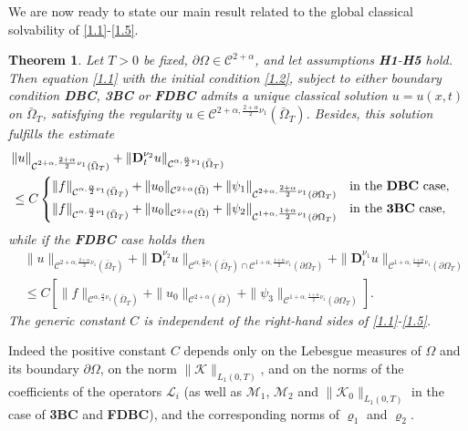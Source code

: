 \documentclass[reqno]{amsart}
\def\C {\mathcal{C}}
\newtheorem{theorem}[proposition]{Theorem}
\theoremstyle{definition}
\numberwithin{equation}{section}
\begin{document}
\noindent
We are now ready to state our main result related to the global classical solvability of \eqref{1.1}-\eqref{1.5}.
\begin{theorem}\label{t3.1}
Let $T>0$ be fixed, $\partial\Omega\in\C^{2+\alpha}$,
and let assumptions {\rm \textbf{H1}-\textbf{H5}} hold.
Then equation \eqref{1.1} with the initial condition \eqref{1.2}, subject to
either boundary condition
{\rm \textbf{DBC}}, {\rm \textbf{3BC}}  or
{\rm \textbf{FDBC}} admits a unique classical solution $u=u(x,t)$ on $\bar{\Omega}_{T}$, satisfying the regularity $u\in \C^{2+\alpha,\frac{2+\alpha}{2}\nu_{1}}(\bar{\Omega}_{T})$.
Besides, this solution fulfills the estimate
\begin{align*}
&\|u\|_{\C^{2+\alpha,\frac{2+\alpha}{2}\nu_{1}}(\bar{\Omega}_{T})}+\|\mathbf{D}_{t}^{\nu_2}u\|_{\C^{\alpha,\frac{\alpha}{2}\nu_{1}}(\bar{\Omega}_{T})}\\
&
\leq C
\begin{cases}
\|f\|_{\C^{\alpha,\frac{\alpha}{2}\nu_{1}}(\bar{\Omega}_{T})}+\|u_0\|_{\C^{2+\alpha}(\bar{\Omega})}+\|\psi_{1}\|_{\C^{2+\alpha,\frac{2+\alpha}{2}\nu_{1}}(\partial\Omega_{T})}\quad\text{in the
{\rm \textbf{DBC}} case},\\
\|f\|_{\C^{\alpha,\frac{\alpha}{2}\nu_{1}}(\bar{\Omega}_{T})}+\|u_0\|_{\C^{2+\alpha}(\bar{\Omega})}+\|\psi_{2}\|_{\C^{1+\alpha,\frac{1+\alpha}{2}\nu_{1}}(\partial\Omega_{T})}\quad
\text{in the {\rm\textbf{3BC}} case},
\end{cases}
\end{align*}
while if the {\rm\textbf{FDBC}} case holds then
\begin{align*}
&\|u\|_{\C^{2+\alpha,\frac{2+\alpha}{2}\nu_{1}}(\bar{\Omega}_{T})}
+\|\mathbf{D}_{t}^{\nu_2}u\|_{\C^{\alpha,\frac{\alpha}{2}\nu_{1}}(\bar{\Omega}_{T})\cap\C^{1+\alpha,\frac{1+\alpha}{2}\nu_{1}}(\partial\Omega_{T})}+
\|\mathbf{D}_{t}^{\nu_{1}}u\|_{\C^{1+\alpha,\frac{1+\alpha}{2}\nu_{1}}(\partial\Omega_{T})}
\\
&
\leq C[
\|f\|_{\C^{\alpha,\frac{\alpha}{2}\nu_{1}}(\bar{\Omega}_{T})}+\|u_0\|_{\C^{2+\alpha}(\bar{\Omega})}+\|\psi_{3}\|_{\C^{1+\alpha,\frac{1+\alpha}{2}\nu_{1}}(\partial\Omega_{T})}].
\end{align*}
The generic constant $C$ is independent of the right-hand sides of \eqref{1.1}-\eqref{1.5}.
\end{theorem}

Indeed the positive constant $C$ depends only on the Lebesgue measures of $\Omega$ and its boundary $\partial\Omega$, on the norm $\|\mathcal{K}\|_{L_1(0,T)}$, and on the norms of the coefficients of the operators $\mathcal{L}_{i}$ (as well as $\mathcal{M}_1$, $\mathcal{M}_2$ and $\|\mathcal{K}_0\|_{L_1(0,T)}$ in the case of \textbf{3BC} and \textbf{FDBC}), and the corresponding norms of $\varrho_1$ and $\varrho_{2}$.
\end{document}
